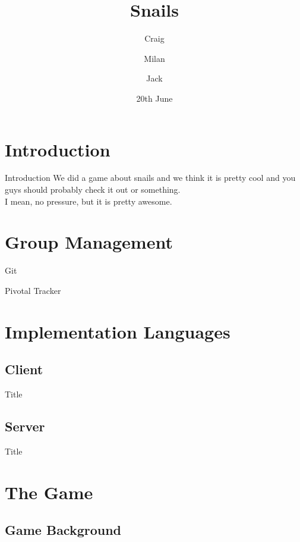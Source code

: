 \documentclass{beamer}
\title{Snails}
\author{Craig \and Milan \and Jack}
\date{20th June}
\begin{document}
\begin{frame}
  \titlepage
\end{frame}

\section{Introduction}

\begin{frame}{Introduction}
  We did a game about snails and we think it is pretty cool and you guys should probably check it out or something. \\
  \vspace{\baselineskip}
  I mean, no pressure, but it is pretty awesome.
\end{frame}


\section{Group Management}

\begin{frame}{Git}
\end{frame}

\begin{frame}{Pivotal Tracker}
\end{frame}

\section{Implementation Languages}
\subsection{Client}

\begin{frame}{Title}
\end{frame}

\subsection{Server}

\begin{frame}{Title}
\end{frame}


\section{The Game}
\subsection{Game Background}
\end{document}
